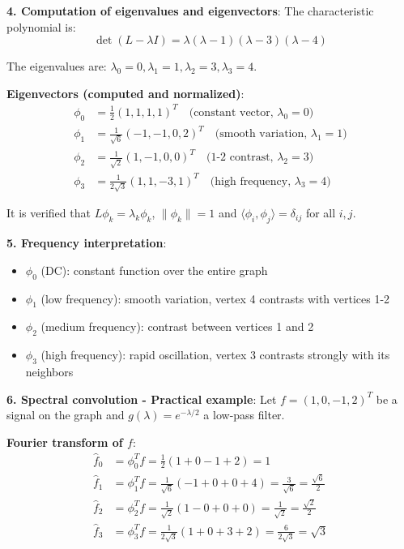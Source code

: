 \begin{example}
\textbf{4. Computation of eigenvalues and eigenvectors}:
The characteristic polynomial is:
\begin{equation}
\det(L - \lambda I) = \lambda(\lambda - 1)(\lambda - 3)(\lambda - 4)
\end{equation}

The eigenvalues are: $\lambda_0 = 0, \lambda_1 = 1, \lambda_2 = 3, \lambda_3 = 4$.

\textbf{Eigenvectors (computed and normalized)}:
\begin{align}
\phi_0 &= \tfrac{1}{2}(1, 1, 1, 1)^T \quad \text{(constant vector, $\lambda_0 = 0$)} \\
\phi_1 &= \tfrac{1}{\sqrt{6}}(-1, -1, 0, 2)^T \quad \text{(smooth variation, $\lambda_1 = 1$)} \\
\phi_2 &= \tfrac{1}{\sqrt{2}}(1, -1, 0, 0)^T \quad \text{(1-2 contrast, $\lambda_2 = 3$)} \\
\phi_3 &= \tfrac{1}{2\sqrt{3}}(1, 1, -3, 1)^T \quad \text{(high frequency, $\lambda_3 = 4$)}
\end{align}

It is verified that $L\phi_k = \lambda_k \phi_k$, $\|\phi_k\| = 1$ and $\langle \phi_i, \phi_j \rangle = \delta_{ij}$ for all $i, j$.

\textbf{5. Frequency interpretation}:
\begin{itemize}
    \item $\phi_0$ (DC): constant function over the entire graph
    \item $\phi_1$ (low frequency): smooth variation, vertex 4 contrasts with vertices 1-2
    \item $\phi_2$ (medium frequency): contrast between vertices 1 and 2
    \item $\phi_3$ (high frequency): rapid oscillation, vertex 3 contrasts strongly with its neighbors
\end{itemize}

\textbf{6. Spectral convolution - Practical example}:
Let $f = (1, 0, -1, 2)^T$ be a signal on the graph and $g(\lambda) = e^{-\lambda/2}$ a low-pass filter.

\textbf{Fourier transform of $f$}:
\begin{align}
\hat{f}_0 &= \phi_0^T f = \tfrac{1}{2}(1 + 0 - 1 + 2) = 1 \\
\hat{f}_1 &= \phi_1^T f = \tfrac{1}{\sqrt{6}}(-1 + 0 + 0 + 4) = \tfrac{3}{\sqrt{6}} = \tfrac{\sqrt{6}}{2} \\
\hat{f}_2 &= \phi_2^T f = \tfrac{1}{\sqrt{2}}(1 - 0 + 0 + 0) = \tfrac{1}{\sqrt{2}} = \tfrac{\sqrt{2}}{2} \\
\hat{f}_3 &= \phi_3^T f = \tfrac{1}{2\sqrt{3}}(1 + 0 + 3 + 2) = \tfrac{6}{2\sqrt{3}} = \sqrt{3}
\end{align}


\end{example}
